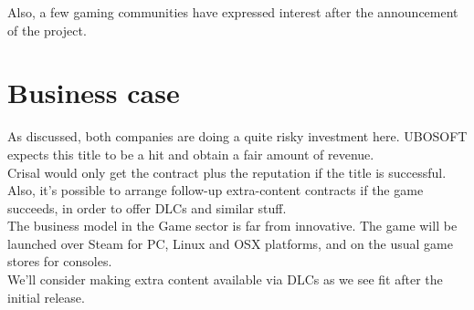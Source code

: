 \documentclass{article}
\begin{document}
  Also, a few gaming communities have expressed interest after the announcement
  of the project.

\section{Business case}

  As discussed, both companies are doing a quite risky investment here. UBOSOFT
  expects this title to be a hit and obtain a fair amount of revenue. \\

  Crisal would only get the contract plus the reputation if the title is
  successful. Also, it's possible to arrange follow-up extra-content contracts
  if the game succeeds, in order to offer DLCs and similar stuff. \\

  The business model in the Game sector is far from innovative. The game will be
  launched over Steam for PC, Linux and OSX platforms, and on the usual game
  stores for consoles. \\

  We'll consider making extra content available via DLCs as we see fit after the
  initial release. \\
\end{document}
